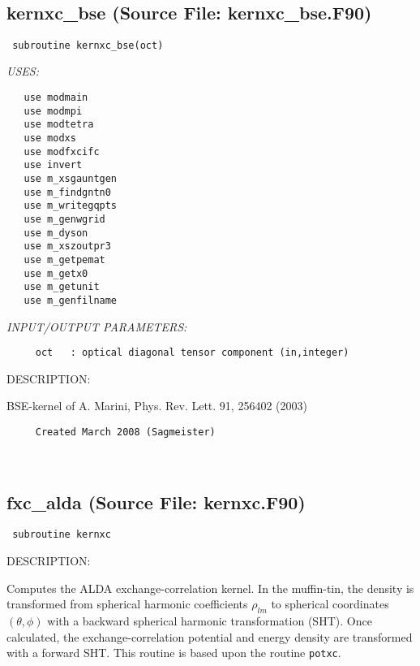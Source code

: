 \documentclass[11pt]{article}
\begin{document}

 
 
\mbox{}\hrulefill\ 
 
\subsection{kernxc\_bse (Source File: kernxc\_bse.F90)}


\begin{verbatim} subroutine kernxc_bse(oct)\end{verbatim}{\em USES:}
\begin{verbatim}   use modmain
   use modmpi
   use modtetra
   use modxs
   use modfxcifc
   use invert
   use m_xsgauntgen
   use m_findgntn0
   use m_writegqpts
   use m_genwgrid
   use m_dyson
   use m_xszoutpr3
   use m_getpemat
   use m_getx0
   use m_getunit
   use m_genfilname\end{verbatim}{\em INPUT/OUTPUT PARAMETERS:}
\begin{verbatim}     oct   : optical diagonal tensor component (in,integer)\end{verbatim}
{\sf DESCRIPTION:\\ }


     BSE-kernel of A. Marini, Phys. Rev. Lett. 91, 256402 (2003)
  
\begin{verbatim}     Created March 2008 (Sagmeister)\end{verbatim}


 
 
\mbox{}\hrulefill\ 
 
\subsection{fxc\_alda (Source File: kernxc.F90)}


\begin{verbatim} subroutine kernxc\end{verbatim}
{\sf DESCRIPTION:\\ }


     Computes the ALDA exchange-correlation kernel. In the
     muffin-tin, the density is transformed from spherical harmonic coefficients
     $\rho_{lm}$ to spherical coordinates $(\theta,\phi)$ with a backward
     spherical harmonic transformation (SHT). Once calculated, the
     exchange-correlation potential and energy density are transformed with a
     forward SHT. This routine is based upon the routine {\tt potxc}.
  
\end{document}
